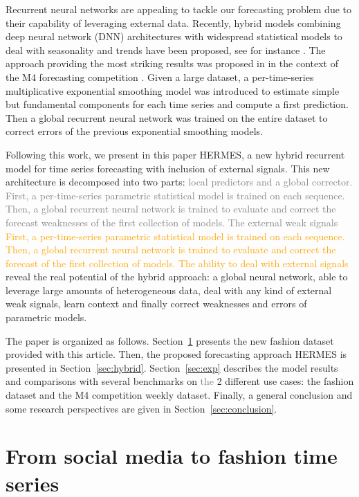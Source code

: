 \documentclass[10pt]{article} %
\begin{document}
Recurrent neural networks are appealing to tackle our forecasting problem due to their capability of leveraging external data.  Recently, hybrid models combining deep neural network (DNN) architectures with widespread statistical models to deal with seasonality and trends have been proposed, see for instance  \citet{zhang2003,jianwei2019,bandara2020}. The approach providing the most striking results was proposed in  \citet{smyl2020} in the context of the M4 forecasting competition \citep{makridakis2020}.  Given a large dataset, a per-time-series multiplicative exponential smoothing model was introduced to estimate simple but fundamental components for each time series and compute a first prediction. Then a global recurrent neural network was trained on the entire dataset to correct errors of the previous exponential smoothing models. 

Following this work, we present in this paper HERMES, a new hybrid recurrent model for time series forecasting with inclusion of external signals. This new architecture is decomposed  into two parts: \textcolor{gray}{local predictors and a global corrector. First, a per-time-series parametric statistical model is trained on each sequence. Then, a global recurrent neural network is trained to evaluate and correct the forecast weaknesses of the first collection of models. The external weak signals} \textcolor{orange}{First, a per-time-series parametric statistical model is trained on each sequence. Then, a global recurrent neural network is trained to evaluate and correct the forecast of the first collection of models. The ability to deal with external signals} reveal the real potential of the hybrid approach: a global neural network, able to leverage large amounts of heterogeneous data, deal with any kind of external weak signals, learn context and finally correct weaknesses and errors of parametric models.

The paper is organized as follows. Section~\ref{sec:dataset} presents the new fashion dataset provided with this article. Then, the proposed forecasting approach HERMES is presented in Section~\ref{sec:hybrid}. Section~\ref{sec:exp} describes the model results and comparisons with several benchmarks on \textcolor{gray}{the} 2 different use cases: the fashion dataset and the M4 competition weekly dataset. Finally, a general conclusion and some research perspectives are given in  Section~\ref{sec:conclusion}.

\section{From social media to fashion time series}
\label{sec:dataset}
\end{document}
